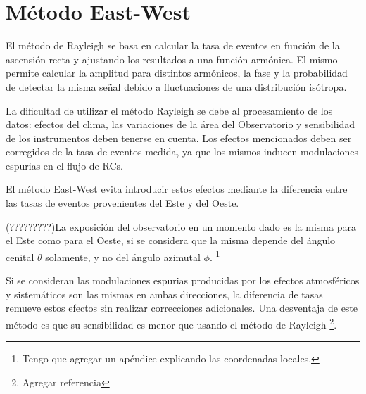 
\chapter{Método East-West}

El método de Rayleigh se basa en calcular la tasa de eventos en función de la ascensión recta y ajustando los resultados a una función armónica. El mismo permite calcular la amplitud para distintos armónicos, la fase y la probabilidad de detectar la misma señal debido a fluctuaciones de una distribución isótropa. 

La dificultad de utilizar el método Rayleigh se debe al procesamiento de los datos: efectos del clima, las variaciones de la área del Observatorio y sensibilidad de los instrumentos deben tenerse en cuenta.  Los efectos mencionados deben ser corregidos de la tasa de eventos medida, ya que los mismos inducen modulaciones espurias en el flujo de RCs.

El método East-West evita introducir estos efectos mediante la diferencia entre las tasas de eventos provenientes del Este y del Oeste.

(?????????)La exposición del observatorio en un momento dado es la misma para el Este como para el Oeste, si se considera que la misma depende del ángulo cenital $\theta$ solamente, y no del ángulo azimutal $\phi$. \footnote{Tengo que agregar un apéndice explicando las coordenadas locales.}

Si se consideran las modulaciones espurias producidas por los efectos atmosféricos y sistemáticos son las mismas en ambas direcciones, la diferencia de tasas remueve estos efectos sin realizar correcciones adicionales. Una desventaja de este método es que su sensibilidad es menor que usando el método de Rayleigh \footnote{Agregar referencia}.

